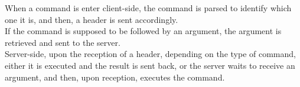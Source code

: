 \documentclass{article}
\begin{document}
When a command is enter client-side, the command is parsed to identify which one it is, and then, a header is sent accordingly.\\
If the command is supposed to be followed by an argument, the argument is retrieved and sent to the server.\\

Server-side, upon the reception of a header, depending on the type of command, either it is executed and the result is sent back, or the server waits to receive an argument, and then, upon reception, executes the command.
\end{document}
